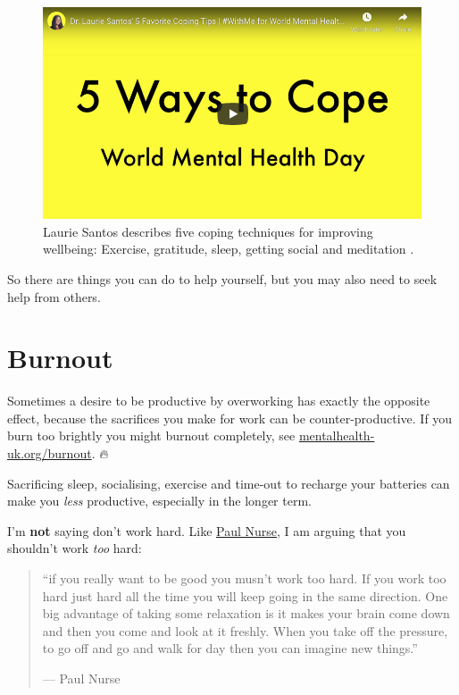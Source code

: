\documentclass[
]{book}
\begin{document}
\begin{figure}

{\centering \includegraphics[width=0.99\linewidth]{images/youtube-santos} 

}

\caption{Laurie Santos describes five coping techniques for improving wellbeing: Exercise, gratitude, sleep, getting social and meditation \citep{youtube-santos}.}\label{fig:laurie-fig}
\end{figure}



So there are things you can do to help yourself, but you may also need to seek help from others.

\hypertarget{burnout}{%
\section{Burnout}\label{burnout}}

Sometimes a desire to be productive by overworking has exactly the opposite effect, because the sacrifices you make for work can be counter-productive. If you burn too brightly you might burnout completely, see \href{https://mentalhealth-uk.org/burnout/}{mentalhealth-uk.org/burnout}. 🔥

Sacrificing sleep, socialising, exercise and time-out to recharge your batteries can make you \emph{less} productive, especially in the longer term.

I'm \textbf{not} saying don't work hard. Like \href{https://en.wikipedia.org/wiki/Paul_Nurse}{Paul Nurse}, I am arguing that you shouldn't work \emph{too} hard:

\begin{quote}
``if you really want to be good you musn't work too hard. If you work too hard just hard all the
time you will keep going in the same direction. One big advantage of taking some relaxation is it
makes your brain come down and then you come and look at it freshly. When you take off the
pressure, to go off and go and walk for day then you can imagine new things.''

\hfill --- Paul Nurse \citep{paulnurse}
\end{quote}
\end{document}
